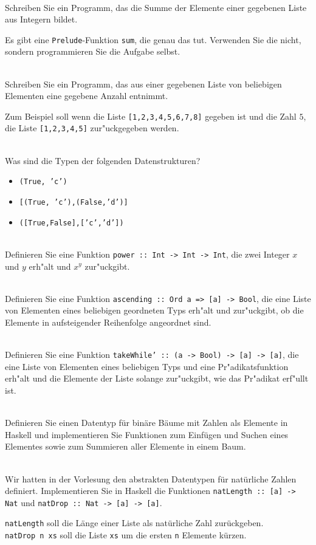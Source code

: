 \\
Schreiben Sie ein Programm, das die Summe der Elemente einer gegebenen Liste aus Integern bildet.
\begin{notes}
  Es gibt eine \texttt{Prelude}-Funktion \texttt{sum}, die genau das tut. Verwenden Sie die nicht, sondern programmieren Sie die Aufgabe selbst.
\end{notes}


\\
Schreiben Sie ein Programm, das aus einer gegebenen Liste von beliebigen Elementen eine gegebene Anzahl entnimmt.

Zum Beispiel soll wenn die Liste \texttt{[1,2,3,4,5,6,7,8]} gegeben ist und die Zahl $5$, die Liste \texttt{[1,2,3,4,5]} zur"uckgegeben werden.

\\
Was sind die Typen der folgenden Datenstrukturen?
\begin{itemize}[(i)]
  \item \texttt{(True, 'c')}
  \item \texttt{[(True, 'c'),(False,'d')]}
  \item \texttt{([True,False],['c','d'])}
\end{itemize}

\\
Definieren Sie eine Funktion \texttt{power :: Int -> Int -> Int}, die zwei Integer $x$ und $y$ erh"alt und $x^y$ zur"uckgibt.

\\
Definieren Sie eine Funktion \texttt{ascending :: Ord a => [a] -> Bool}, die eine Liste von Elementen eines beliebigen geordneten Typs erh"alt und zur"uckgibt, ob die Elemente in aufsteigender Reihenfolge angeordnet sind.

\\
Definieren Sie eine Funktion \texttt{takeWhile' :: (a -> Bool) -> [a] -> [a]}, die eine Liste von Elementen eines beliebigen Typs und eine Pr"adikatsfunktion erh"alt und die Elemente der Liste solange zur"uckgibt, wie das Pr"adikat erf"ullt ist.

\\
Definieren Sie einen Datentyp für binäre Bäume mit Zahlen als Elemente in Haskell und implementieren Sie Funktionen zum Einfügen und Suchen eines Elementes sowie zum Summieren aller Elemente in einem Baum.

\\
Wir hatten in der Vorlesung den abstrakten Datentypen für natürliche Zahlen definiert.
Implementieren Sie in Haskell die Funktionen \texttt{natLength :: [a] -> Nat} und \texttt{natDrop :: Nat -> [a] -> [a]}.
\begin{notes}
  \texttt{natLength} soll die Länge einer Liste als natürliche Zahl zurückgeben. \\
  \texttt{natDrop n xs} soll die Liste \texttt{xs} um die ersten \texttt{n} Elemente kürzen.
\end{notes}



